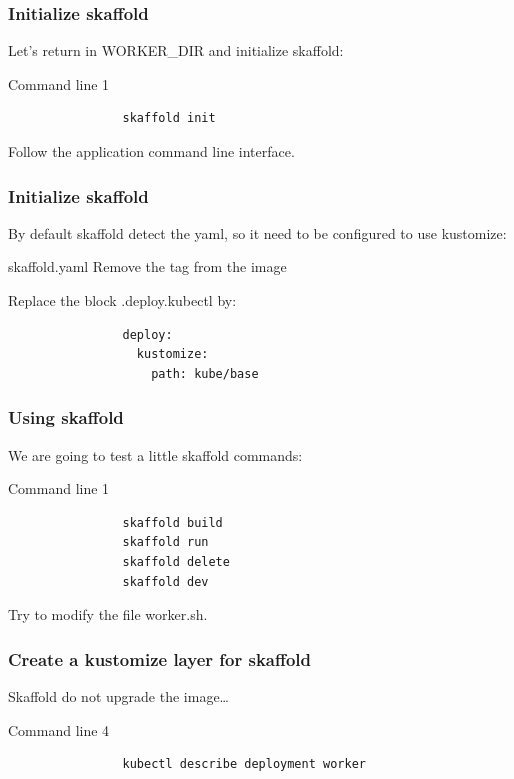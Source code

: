 	\begin{frame}[fragile]
		\frametitle{Initialize skaffold}
		
		Let's return in WORKER\_DIR and initialize skaffold:
		\begin{block}{Command line 1}
			\begin{verbatim}
				skaffold init
			\end{verbatim}
			Follow the application command line interface.
		\end{block}
	\end{frame}
	
	\begin{frame}[fragile]
		\frametitle{Initialize skaffold}

		By default skaffold detect the yaml, so it need to be configured to use kustomize:
		\begin{block}{skaffold.yaml}
			Remove the tag from the image
			
			\medskip
			Replace the block .deploy.kubectl by:
			\begin{verbatim}
				deploy:
				  kustomize:
				    path: kube/base			
			\end{verbatim}						
		\end{block}
	\end{frame}
	
	\begin{frame}[fragile]
		\frametitle{Using skaffold}
		
		We are going to test a little skaffold commands:
		\begin{block}{Command line 1}
			\begin{verbatim}
				skaffold build
				skaffold run
				skaffold delete
				skaffold dev
			\end{verbatim}					
		\end{block}
		
		Try to modify the file worker.sh.
	
	\end{frame}
	
	\begin{frame}[fragile]
		\frametitle{Create a kustomize layer for skaffold}
		
		Skaffold do not upgrade the image…
		\begin{block}{Command line 4}
			\begin{verbatim}
				kubectl describe deployment worker
			\end{verbatim}
		\end{block}
		
	\end{frame}
	

